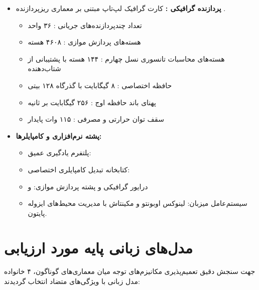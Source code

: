 \documentclass[12pt,a4paper]{report}
\theoremstyle{definition}
\begin{document}
\begin{itemize}
    \item \textbf{پردازنده گرافیکی :} کارت گرافیک لپ‌تاپ  مبتنی بر معماری ریزپردازنده .
    \begin{itemize}
        \item تعداد چندپردازنده‌های جریانی : ۳۶ واحد
        \item هسته‌های پردازش موازی : ۴۶۰۸ هسته
        \item هسته‌های محاسبات تانسوری نسل چهارم : ۱۴۴ هسته با پشتیبانی از شتاب‌دهنده 
        \item حافظه اختصاصی : ۸ گیگابایت  با گذرگاه ۱۲۸ بیتی
        \item پهنای باند حافظه اوج : ۲۵۶ گیگابایت بر ثانیه 
        \item سقف توان حرارتی و مصرفی : ۱۱۵ وات پایدار
    \end{itemize}
    \item \textbf{پشته نرم‌افزاری و کامپایلرها:}
    \begin{itemize}
        \item پلتفرم یادگیری عمیق: 
        \item کتابخانه تبدیل کامپایلری اختصاصی: 
        \item درایور گرافیکی و پشته پردازش موازی:  و 
        \item سیستم‌عامل میزبان: لینوکس اوبونتو و مکینتاش با مدیریت محیط‌های ایزوله پایتون.
    \end{itemize}
\end{itemize}

\section{مدل‌های زبانی پایه مورد ارزیابی}
جهت سنجش دقیق تعمیم‌پذیری مکانیزم‌های توجه میان معماری‌های گوناگون، ۴ خانواده مدل زبانی با ویژگی‌های متضاد انتخاب گردیدند:
\end{document}
